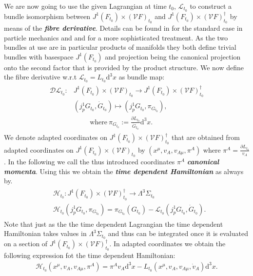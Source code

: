 \documentclass[a4paper,12pt, DIV=14, BCOR=5mm, twoside, headsepline]{scrbook}
\begin{document}
We are now going to use the given Lagrangian at time $t_0$, $\mathcal{L}_{t_0}$ to construct a bundle isomorphism between $J^1(F_{t_0}) \times (\mathcal{V}F)_{t_0}$ and $J^1(F_{t_0}) \times (\mathcal{V}F)_{t_0}^{\dagger}$ by means of the \textit{\textbf{fibre derivative}}. Details can be found in \cite{abraham2008foundations} for the standard case in particle mechanics and \cite{2000RpMP...45...67G} and \cite{AIF_1973__23_1_203_0} for a more sophisticated treatment.
As the two bundles at use are in particular products of manifolds they both define trivial bundles with basespace $J^1(F_{t_0})$ and projection being the canonical projection onto the second factor that is provided by the product structure. We now define the fibre derivative w.r.t $\mathcal{L}_{t_0} = L_{t_0}\mathrm{d}^3x$ as bundle map:
\begin{align}
\begin{aligned}
    \mathcal{D}\mathcal{L}_{t_0} : &J^1(F_{t_0}) \times (\mathcal{V}F)_{t_0} \longrightarrow J^1(F_{t_0}) \times (\mathcal{V}F)_{t_0}^{\dagger}\\
    &(j^1_pG_{t_0},\dot{G}_{t_0}) \longmapsto (j^1_pG_{t_0},\pi_{G_{t_0}}), \\
    & \hspace{1cm} \text{where}  \ \pi_{G_{t_0}} := \frac{\partial L_{t_0}}{\dot{G}_{t_0}}\mathrm{d}^3x.
\end{aligned}
\end{align}
We denote adapted coordinates on  $J^1(F_{t_0}) \times (\mathcal{V}F)_{t_0}^{\dagger}$ that are obtained from adapted coordinates on $J^1(F_{t_0}) \times (\mathcal{V}F)_{t_0}$ by $(x^\mu,v_A,v_{A\mu},\pi^A)$ where $\pi^A = \frac{\partial L_{t_0}}{v_A}$. In the following we call the thus introduced coordinates $\pi^A$ \textit{\textbf{canonical momenta}}.
Using this we obtain the \textit{\textbf{time dependent Hamiltonian}} as always by.
\begin{align}\label{Ham}
\begin{aligned}
&\mathcal{H}_{t_0} : J^1(F_{t_0}) \times (\mathcal{V}F)_{t_0}^{\dagger} \longrightarrow \Lambda^3\Sigma_{t_0} \\
    &\mathcal{H}_{t_0}(j^1_pG_{t_0},\pi_{G_{t_0}}) = \pi_{G_{t_0}}(G_{t_0}) - \mathcal{L}_{t_0}(j^1_pG_{t_0},\dot{G}_{t_0}). 
\end{aligned}
\end{align}
Note that just as the the time dependent Lagrangian the time dependent Hamiltonian takes values in $\Lambda^3\Sigma_{t_0}$ and thus can be integrated once it is evaluated on a section of  $J^1(F_{t_0}) \times (\mathcal{V}F)_{t_0}^{\dagger}$.
In adapted coordinates we obtain the following expression fot the time dependent Hamiltonian:
\begin{align}
    \mathcal{H}_{t_0}(x^\mu, v_A, v_{A\mu},\pi^A) = \pi^A v_A \mathrm{d}^3x - L_{t_0}(x^\mu,v_A,v_{A\mu},\dot{v}_A) \mathrm{d}^3x.
\end{align}
\end{document}
